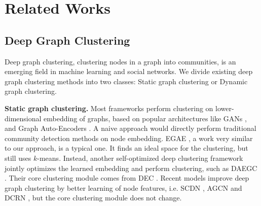 \documentclass[letterpaper]{article} %
\begin{document}
\section{Related Works}

\subsection{Deep Graph Clustering}

Deep graph clustering, clustering nodes in a graph into communities, is an emerging field in machine learning and social networks. %
We divide existing deep graph clustering methods into two classes: Static graph clustering or Dynamic graph clustering.

\noindent\textbf{Static graph clustering.} Most frameworks perform clustering on lower-dimensional embedding of graphs, based on popular architectures like GANs \cite{creswell2018generative}, and Graph Auto-Encoders \cite{kipf2016variational}. A naive approach would directly perform traditional community detection methods on node embedding. EGAE \cite{zhang2022embedding}, a work very similar to our approach, is a typical one. It finds an ideal space for the clustering, but still uses $k$-means. Instead, another self-optimized deep clustering framework jointly optimizes the learned embedding and perform clustering, such as DAEGC \cite{wang2019attributedDAEGC}. Their core clustering module comes from DEC \cite{xie2016unsupervisedDEC}. Recent models improve deep graph clustering by better learning of node features, i.e. SCDN \cite{bo2020structural}, AGCN \cite{peng2021attention} and DCRN \cite{dcrn}, but the core clustering module does not change.
\end{document}
